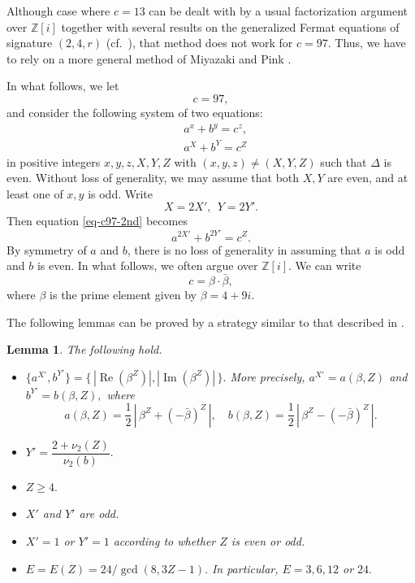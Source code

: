\documentclass[11pt]{amsart}
\newtheorem{lem}{Lemma}[section]
\numberwithin{equation}{section}
\begin{document}
Although case where $c=13$ can be dealt with by a usual factorization argument over $\mathbb Z[i]$ together with several results on the generalized Fermat equations of signature $(2,4,r)$ (cf.~\cite[Sec.\,8]{MP3}), that method does not work for $c=97$.
Thus, we have to rely on a more general method of Miyazaki and Pink \cite{MP2}.

In what follows, we let 
\[
c=97,
\]
and consider the following system of two equations:
\begin{eqnarray}
&a^x+b^y=c^z,\label{eq-c97-1st}\\ 
&a^X+b^Y=c^Z \label{eq-c97-2nd}
\end{eqnarray}
in positive integers $x,y,z,X,Y,Z$ with $(x,y,z) \ne (X,Y,Z)$ such that $\Delta$ is even.
Without loss of generality, we may assume that both $X,Y$ are even, and at least one of $x,y$ is odd.
Write 
\[ 
X=2X', \ \ Y=2Y'.
\]
Then equation \eqref{eq-c97-2nd} becomes
\begin{equation} \label{eq-c97-2nd'}
a^{2X'}+b^{2Y'}=c^Z.
\end{equation}
By symmetry of $a$ and $b$, there is no loss of generality in assuming that $a$ is odd and $b$ is even.
In what follows, we often argue over $\mathbb Z[i]$.
We can write
\[
c=\beta \cdot \bar{\beta},
\] 
where $\beta$ is the prime element given by $\beta=4+9i$.

The following lemmas can be proved by a strategy similar to that described in \cite[Secs.\,7 and 8]{MP2}.

\begin{lem}\label{lem-c97-Eeven-first}
The following hold.
\begin{itemize}
\item[\rm (i)]
$\{a^{X'},b^{Y'}\}=\{\,|\operatorname{Re} (\beta^Z)|,|\operatorname{Im} (\beta^Z)|\,\}.$
More precisely, $a^{X'}=a(\beta,Z)$ and $b^{Y'}=b(\beta,Z),$ where
\[
a(\beta,Z)=\dfrac{1}{2}\,|\,\beta^Z+(-\bar{\beta})^Z\,|,
\quad
b(\beta,Z)=\dfrac{1}{2}\,|\,\beta^Z-(-\bar{\beta})^Z\,|.
\]
\item[\rm (ii)]
$Y'=\dfrac{2+\nu_2(Z)}{\nu_2(b)}.$
\item[\rm (iii)]
$Z \ge 4.$
\item[\rm (iv)]
$X'$ and $Y'$ are odd.
\item[\rm (v)]
$X'=1$ or $Y'=1$ according to whether $Z$ is even or odd.
\item[\rm (vi)]
$E=E(Z)=24/\gcd(8,3Z-1).$
In particular, $E=3,6,12$ or $24.$
\end{itemize}
\end{lem}
\end{document}
